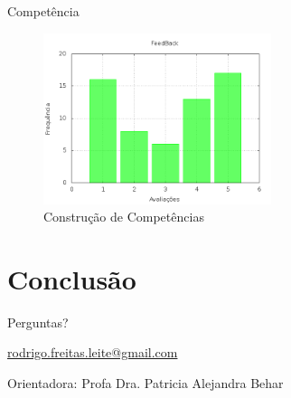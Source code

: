 \documentclass[xcolor=dvipsnames]{beamer}
\begin{document}

		\begin{frame}[fragile]{Competência}
			\begin{figure}[!htb]
				\centering
				\includegraphics[keepaspectratio=true,height=5cm]{feed.png}
				\caption{Construção de Competências}
				\label{feed}
			\end{figure}
		\end{frame}


\section{Conclusão}
	\begin{frame}{Perguntas?}
		\titlepage
		\begin{center}					
		 \href{mailto:rodrigo.freitas.leite@gmail.com}{rodrigo.freitas.leite@gmail.com} 
		\end{center}

	\begin{center}
		Orientadora: Profa Dra. Patricia Alejandra Behar
	\end{center}		
	\end{frame}
\end{document}

